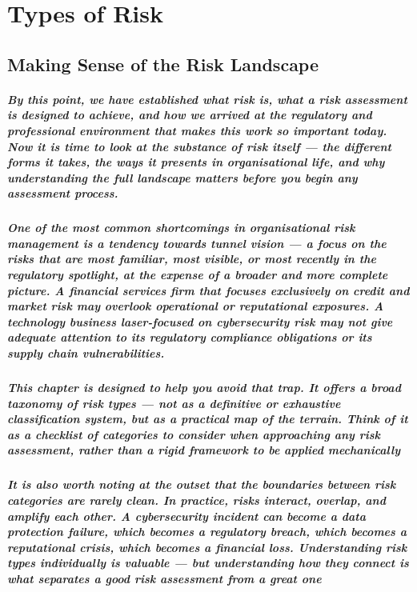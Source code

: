 \chapter{Types of Risk}
\label{chap:Types of Risk}

\section{Making Sense of the Risk Landscape}

\paragraph{By this point, we have established what risk is, what a risk assessment is designed to achieve, and how we arrived at the regulatory and professional environment that makes this work so important today. Now it is time to look at the \textit{substance} of risk itself — the different forms it takes, the ways it presents in organisational life, and why understanding the full landscape matters before you begin any assessment process.}

\paragraph{One of the most common shortcomings in organisational risk management is a tendency towards \textbf{tunnel vision} — a focus on the risks that are most familiar, most visible, or most recently in the regulatory spotlight, at the expense of a broader and more complete picture. A financial services firm that focuses exclusively on credit and market risk may overlook operational or reputational exposures. A technology business laser-focused on cybersecurity risk may not give adequate attention to its regulatory compliance obligations or its supply chain vulnerabilities.}

\paragraph{This chapter is designed to help you avoid that trap. It offers a broad taxonomy of risk types — not as a definitive or exhaustive classification system, but as a practical map of the terrain. Think of it as a checklist of \textit{categories to consider} when approaching any risk assessment, rather than a rigid framework to be applied mechanically}

\paragraph{It is also worth noting at the outset that the boundaries between risk categories are rarely clean. In practice, risks interact, overlap, and amplify each other. A cybersecurity incident can become a data protection failure, which becomes a regulatory breach, which becomes a reputational crisis, which becomes a financial loss. Understanding risk types individually is valuable — but understanding how they connect is what separates a good risk assessment from a great one}

